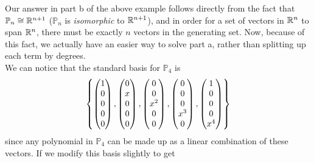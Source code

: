Our answer in part b of the above example follows directly from the fact that $\mathbb{P}_n \cong \mathbb R^{n+1}$ ($\mathbb{P}_n$ is \textit{isomorphic} to $\mathbb R^{n+1}$), and in order for a set of vectors in $\mathbb R^{n}$ to span $\mathbb R^{n}$, there must be exactly $n$ vectors in the generating set. Now, because of this fact, we actually have an easier way to solve part a, rather than splitting up each term by degrees. \\ We can notice that the standard basis for $\mathbb{P}_4$ is 
\[
    \left\{
        \begin{pmatrix}
            1 \\ 0 \\ 0 \\ 0 \\ 0
        \end{pmatrix},
        \begin{pmatrix}
            0 \\ x \\ 0 \\ 0 \\ 0
        \end{pmatrix},
        \begin{pmatrix}
            0 \\ 0 \\ x^2 \\ 0 \\ 0
        \end{pmatrix},
        \begin{pmatrix}
            0 \\ 0 \\ 0 \\ x^3 \\ 0
        \end{pmatrix},
        \begin{pmatrix}
            1 \\ 0 \\ 0 \\ 0 \\ x^4
        \end{pmatrix}
     \right\}
\]
since any polynomial in $\mathbb{P}_4$ can be made up as a linear combination of these vectors. If we modify this basis slightly to get 
